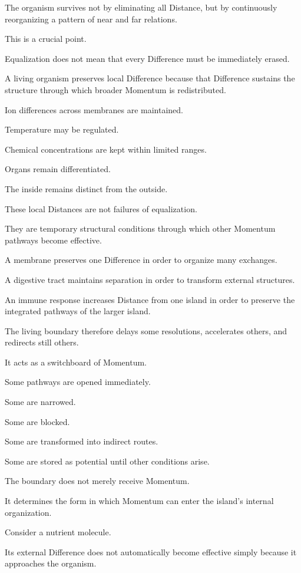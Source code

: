 The organism survives not by eliminating all Distance, but by continuously reorganizing a pattern of near and far relations.

This is a crucial point.

Equalization does not mean that every Difference must be immediately erased.

A living organism preserves local Difference because that Difference sustains the structure through which broader Momentum is redistributed.

Ion differences across membranes are maintained.

Temperature may be regulated.

Chemical concentrations are kept within limited ranges.

Organs remain differentiated.

The inside remains distinct from the outside.

These local Distances are not failures of equalization.

They are temporary structural conditions through which other Momentum pathways become effective.

A membrane preserves one Difference in order to organize many exchanges.

A digestive tract maintains separation in order to transform external structures.

An immune response increases Distance from one island in order to preserve the integrated pathways of the larger island.

The living boundary therefore delays some resolutions, accelerates others, and redirects still others.

It acts as a switchboard of Momentum.

Some pathways are opened immediately.

Some are narrowed.

Some are blocked.

Some are transformed into indirect routes.

Some are stored as potential until other conditions arise.

The boundary does not merely receive Momentum.

It determines the form in which Momentum can enter the island’s internal organization.

Consider a nutrient molecule.

Its external Difference does not automatically become effective simply because it approaches the organism.

